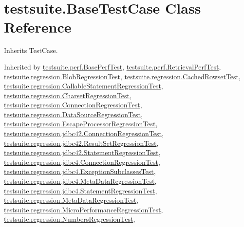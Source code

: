 \hypertarget{classtestsuite_1_1_base_test_case}{}\section{testsuite.\+Base\+Test\+Case Class Reference}
\label{classtestsuite_1_1_base_test_case}


Inherits Test\+Case.



Inherited by \mbox{\hyperlink{classtestsuite_1_1perf_1_1_base_perf_test}{testsuite.\+perf.\+Base\+Perf\+Test}}, \mbox{\hyperlink{classtestsuite_1_1perf_1_1_retrieval_perf_test}{testsuite.\+perf.\+Retrieval\+Perf\+Test}}, \mbox{\hyperlink{classtestsuite_1_1regression_1_1_blob_regression_test}{testsuite.\+regression.\+Blob\+Regression\+Test}}, \mbox{\hyperlink{classtestsuite_1_1regression_1_1_cached_rowset_test}{testsuite.\+regression.\+Cached\+Rowset\+Test}}, \mbox{\hyperlink{classtestsuite_1_1regression_1_1_callable_statement_regression_test}{testsuite.\+regression.\+Callable\+Statement\+Regression\+Test}}, \mbox{\hyperlink{classtestsuite_1_1regression_1_1_charset_regression_test}{testsuite.\+regression.\+Charset\+Regression\+Test}}, \mbox{\hyperlink{classtestsuite_1_1regression_1_1_connection_regression_test}{testsuite.\+regression.\+Connection\+Regression\+Test}}, \mbox{\hyperlink{classtestsuite_1_1regression_1_1_data_source_regression_test}{testsuite.\+regression.\+Data\+Source\+Regression\+Test}}, \mbox{\hyperlink{classtestsuite_1_1regression_1_1_escape_processor_regression_test}{testsuite.\+regression.\+Escape\+Processor\+Regression\+Test}}, \mbox{\hyperlink{classtestsuite_1_1regression_1_1jdbc42_1_1_connection_regression_test}{testsuite.\+regression.\+jdbc42.\+Connection\+Regression\+Test}}, \mbox{\hyperlink{classtestsuite_1_1regression_1_1jdbc42_1_1_result_set_regression_test}{testsuite.\+regression.\+jdbc42.\+Result\+Set\+Regression\+Test}}, \mbox{\hyperlink{classtestsuite_1_1regression_1_1jdbc42_1_1_statement_regression_test}{testsuite.\+regression.\+jdbc42.\+Statement\+Regression\+Test}}, \mbox{\hyperlink{classtestsuite_1_1regression_1_1jdbc4_1_1_connection_regression_test}{testsuite.\+regression.\+jdbc4.\+Connection\+Regression\+Test}}, \mbox{\hyperlink{classtestsuite_1_1regression_1_1jdbc4_1_1_exception_subclasses_test}{testsuite.\+regression.\+jdbc4.\+Exception\+Subclasses\+Test}}, \mbox{\hyperlink{classtestsuite_1_1regression_1_1jdbc4_1_1_meta_data_regression_test}{testsuite.\+regression.\+jdbc4.\+Meta\+Data\+Regression\+Test}}, \mbox{\hyperlink{classtestsuite_1_1regression_1_1jdbc4_1_1_statement_regression_test}{testsuite.\+regression.\+jdbc4.\+Statement\+Regression\+Test}}, \mbox{\hyperlink{classtestsuite_1_1regression_1_1_meta_data_regression_test}{testsuite.\+regression.\+Meta\+Data\+Regression\+Test}}, \mbox{\hyperlink{classtestsuite_1_1regression_1_1_micro_performance_regression_test}{testsuite.\+regression.\+Micro\+Performance\+Regression\+Test}}, \mbox{\hyperlink{classtestsuite_1_1regression_1_1_numbers_regression_test}{testsuite.\+regression.\+Numbers\+Regression\+Test}}, 